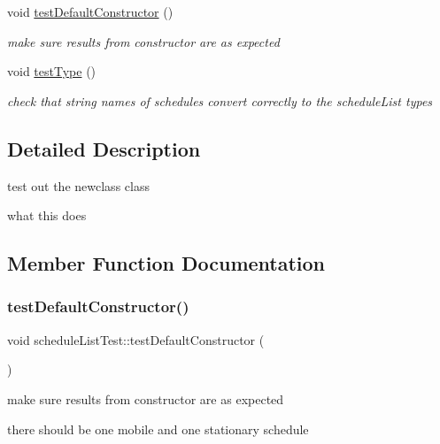 \begin{DoxyCompactItemize}
void \mbox{\hyperlink{classscheduleListTest_a8495411fca3065150fb4ab98b4d950eb}{test\+Default\+Constructor}} ()
\begin{DoxyCompactList}\small\item\em make sure results from constructor are as expected \end{DoxyCompactList}\item 
void \mbox{\hyperlink{classscheduleListTest_a420ec9f4f0d97230ebe2911d5be4a856}{test\+Type}} ()
\begin{DoxyCompactList}\small\item\em check that string names of schedules convert correctly to the schedule\+List types \end{DoxyCompactList}\end{DoxyCompactItemize}


\subsection{Detailed Description}
test out the newclass class 

what this does 

\subsection{Member Function Documentation}
\mbox{\label{classscheduleListTest_a8495411fca3065150fb4ab98b4d950eb}} 
\subsubsection{\texorpdfstring{test\+Default\+Constructor()}{testDefaultConstructor()}}
{\footnotesize\ttfamily void schedule\+List\+Test\+::test\+Default\+Constructor (\begin{DoxyParamCaption}{ }\end{DoxyParamCaption})\hspace{0.3cm}{\ttfamily [inline]}}



make sure results from constructor are as expected 

there should be one mobile and one stationary schedule \mbox{\label{classscheduleListTest_a420ec9f4f0d97230ebe2911d5be4a856}} 
